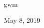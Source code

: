 \documentclass[10pt,journal,compsoc,twocolumn,twoside]{IEEEtran}
\let\MYoriglatexcaption\caption
\renewcommand{\caption}[2][\relax]{\MYoriglatexcaption[#2]{#2}}
\begin{document}
\hfill gwm

\hfill May 8, 2019





%
%

\end{document}
